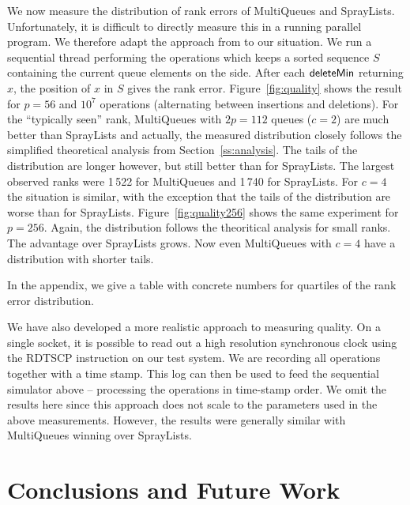 \documentclass[a4paper,12pt]{article}
\newcommand{\Id}[1]{\ensuremath{\text{{\sf #1}}}}
\newcommand{\frage}[1]{{[\bf #1]}\marginpar{$\bigotimes$}}
\renewcommand{\frage}[1]{}
\begin{document}
\frage{todo: half the x-range of Figure~\ref{fig:quality}. optional: average rank over time. doubleoptional: vary number of sampled queues for \Id{deleteMin}, values 1,2,3,4}

We now measure the distribution of rank errors of MultiQueues and SprayLists. Unfortunately, it is difficult to directly measure this in a running parallel program. We therefore adapt the approach from \cite{AKLS14} to our situation. We run a sequential thread performing the operations which keeps a sorted sequence $S$ containing the current queue elements on the side. After each \Id{deleteMin} returning $x$, the position of $x$ in $S$ gives the rank error.
Figure~\ref{fig:quality} shows the result for $p=56$ and $10^7$ operations (alternating between insertions and deletions). For the ``typically seen'' rank, MultiQueues with $2p=112$ queues ($c=2$) are much better than SprayLists and actually, the measured distribution closely follows the simplified theoretical analysis from Section~\ref{ss:analysis}.
The tails of the distribution are longer however, but still better than for SprayLists.
The largest observed ranks were 1\,522 for MultiQueues and 1\,740 for SprayLists. For $c=4$ the situation is similar, with the exception that the tails of the distribution are worse than for SprayLists.
Figure~\ref{fig:quality256} shows the same experiment for $p=256$.
Again, the distribution follows the theoritical analysis for small ranks.
The advantage over SprayLists grows. Now even MultiQueues with $c=4$ have a distribution with shorter tails.

In the appendix, we give a table with concrete numbers for quartiles of the rank error distribution.



We have also developed a more realistic approach to measuring quality. On a single socket, it is possible to read out a high resolution synchronous clock using the RDTSCP instruction on our test system.
We are recording all operations together with a time stamp. This log can then be used to feed the sequential simulator above -- processing the operations in time-stamp order. We omit the results here since this approach does not scale
to the parameters used in the above measurements. However, the results were generally similar with MultiQueues winning over SprayLists.


\section{Conclusions and Future Work}
\label{s:conclusions}
\end{document}
